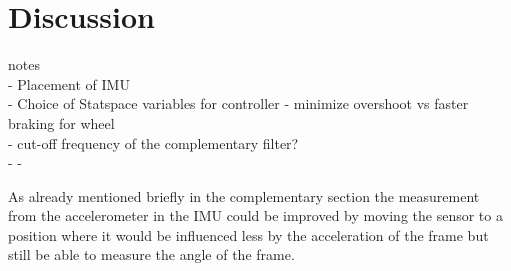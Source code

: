 \chapter{Discussion}

{\Large notes} \\
- Placement of IMU\\
- Choice of Statspace variables for controller - minimize overshoot vs faster braking for wheel\\
- cut-off frequency of the complementary filter?\\
- 
- 


As already mentioned briefly in the complementary section the measurement from the accelerometer in the IMU could be improved by moving the sensor to a position where it would be influenced less by the acceleration of the frame but still be able to measure the angle of the frame. 


